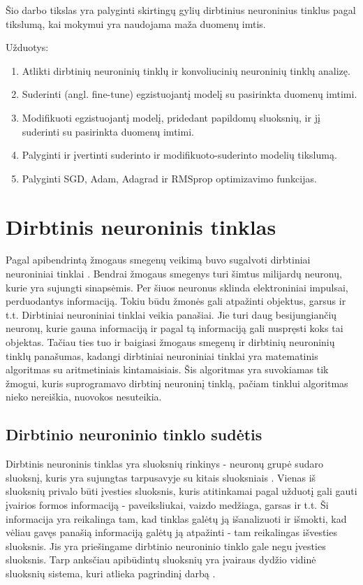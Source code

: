 \documentclass{VUMIFPSkursinis}
\begin{document}
Šio darbo tikslas yra palyginti skirtingų gylių dirbtinius neuroninius tinklus pagal tikslumą, kai mokymui yra naudojama maža duomenų imtis.

Užduotys:
\begin{enumerate}
\item Atlikti dirbtinių neuroninių tinklų ir konvoliucinių neuroninių tinklų analizę.
\item Suderinti (angl. fine-tune) egzistuojantį modelį su pasirinkta duomenų imtimi.
\item Modifikuoti egzistuojantį modelį, pridedant papildomų sluoksnių, ir jį suderinti su pasirinkta duomenų imtimi.
\item Palyginti ir įvertinti suderinto ir modifikuoto-suderinto modelių tikslumą.
\item Palyginti SGD, Adam, Adagrad ir RMSprop optimizavimo funkcijas.
\end{enumerate}

\section{Dirbtinis neuroninis tinklas}
Pagal apibendrintą žmogaus smegenų veikimą buvo sugalvoti dirbtiniai neuroniniai tinklai \cite{Goodfellow-et-al-2016}. Bendrai žmogaus smegenys turi šimtus
milijardų neuronų, kurie yra sujungti sinapsėmis. Per šiuos neuronus sklinda elektroniniai impulsai, perduodantys informaciją. Tokiu būdu žmonės gali 
atpažinti objektus, garsus ir t.t. Dirbtiniai neuroniniai tinklai veikia panašiai. Jie turi daug besijungiančių neuronų, kurie gauna informaciją ir 
pagal tą informaciją gali nuspręsti koks tai objektas. Tačiau ties tuo ir baigiasi žmogaus smegenų ir dirbtinių neuroninių tinklų panašumas, 
kadangi dirbtiniai neuroniniai tinklai yra matematinis algoritmas su aritmetiniais kintamaisiais. Šis algoritmas yra suvokiamas 
tik žmogui, kuris suprogramavo dirbtinį neuroninį tinklą, pačiam tinklui algoritmas nieko nereiškia, nuovokos nesuteikia.

\subsection{Dirbtinio neuroninio tinklo sudėtis}
Dirbtinis neuroninis tinklas yra sluoksnių rinkinys - neuronų grupė sudaro sluoksnį, kuris yra sujungtas tarpusavyje su kitais sluoksniais \cite{1193152}. Vienas iš
sluoksnių privalo būti įvesties sluoksnis, kuris atitinkamai pagal užduotį gali gauti įvairios formos informaciją - paveiksliukai, vaizdo
medžiaga, garsas ir t.t. Ši informacija yra reikalinga tam, kad tinklas galėtų ją išanalizuoti ir išmokti, kad vėliau gavęs panašią
informaciją galėtų ją atpažinti - tam reikalingas išvesties sluoksnis. Jis yra priešingame dirbtinio neuroninio tinklo gale negu įvesties sluoksnis.
Tarp anksčiau apibūdintų sluoksnių yra įvairaus dydžio vidinė sluoksnių sistema, kuri atlieka pagrindinį darbą \cite{Woodford-2018}.
\end{document}

